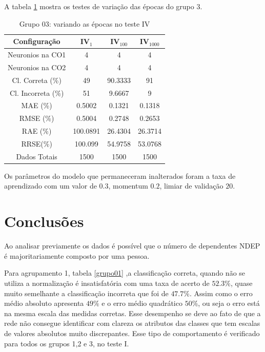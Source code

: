 \documentclass[journal, a4paper]{IEEEtran}
\begin{document}
A tabela \ref{grupo03IV} mostra os testes de variação das épocas do grupo 3. 

\begin{table}[ht]
	\begin{center}
		\caption{Grupo $03$: variando as épocas no teste IV}
		\label{grupo03IV}
		\begin{tabular}{|c|c|c|c|}\hline	
			\textbf{Configuração} &$\textbf{IV}_{1}$&$\textbf{IV}_{100}$&$\textbf{IV}_{1000}$ \\ \hline 
			{Neuronios na CO1}   & 4      & 4     & 4      \\ \hline
			{Neuronios na CO2}   & 4      & 4     & 4      \\ \hline
			{Cl. Correta (\%)}   & 49    & 90.3333  & 91  \\ \hline
			{Cl. Incorreta (\%)} & 51    & 9.6667   & 9   \\ \hline
			{MAE (\%)}           & 0.5002   & 0.1321  & 0.1318   \\ \hline
			{RMSE (\%)}          & 0.5004   & 0.2748  & 0.2653   \\ \hline
			{RAE (\%)}           & 100.0891  & 26.4304 & 26.3714   \\ \hline
			{RRSE(\%)}           & 100.099 & 54.9758 & 53.0768  \\ \hline
			{Dados Totais}       & 1500   & 1500  & 1500   \\ \hline
		\end{tabular}  
	\end{center}
\end{table}


Os parâmetros do modelo que permaneceram inalterados foram a taxa de aprendizado com um valor de $0.3$, momentum $0.2$, limiar de validação $20$. 


\section{Conclusões}
	Ao analisar previamente os dados é possível que o número de dependentes NDEP é majoritariamente composto por uma pessoa. 
	
	Para agrupamento 1, tabela \ref{grupo01} ,a classificação correta, quando não se utiliza a normalização é insatisfatória com uma taxa de acerto de $52.3\%$, quase muito semelhante a classificação incorreta que foi de $47.7\%$. Assim como o erro médio absoluto apresenta $49\%$ e o erro médio quadrático $50\%$, ou seja o erro está na mesma escala das medidas corretas.  Esse desempenho se deve ao fato de que a rede não consegue identificar com clareza os atributos das classes que tem escalas de valores absolutos muito discrepantes. Esse tipo de comportamento é verificado para todos os grupos 1,2 e 3, no teste I.
	
\end{document}
